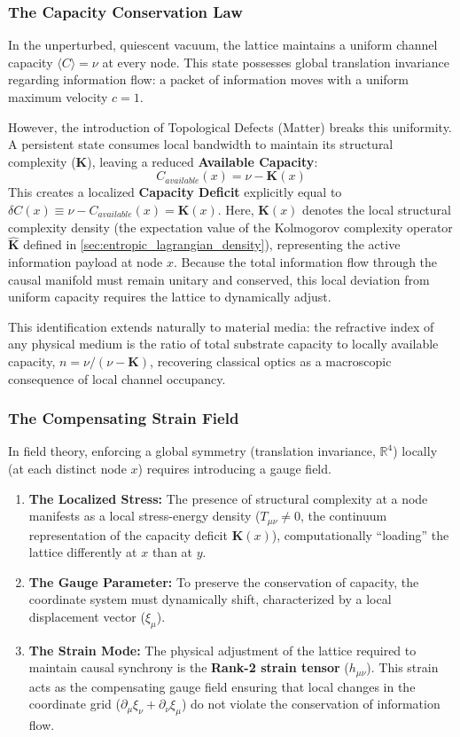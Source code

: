 \subsubsection{The Capacity Conservation Law}
In the unperturbed, quiescent vacuum, the lattice maintains a uniform channel capacity $\langle C \rangle = \nu$ at every node. This state possesses global translation invariance regarding information flow: a packet of information moves with a uniform maximum velocity $c = 1$.

However, the introduction of Topological Defects (Matter) breaks this uniformity. A persistent state consumes local bandwidth to maintain its structural complexity ($\mathbf{K}$), leaving a reduced \textbf{Available Capacity}:
\begin{equation}
C_{available}(x) = \nu - \mathbf{K}(x)
\end{equation}
This creates a localized \textbf{Capacity Deficit} explicitly equal to $\delta C(x) \equiv \nu - C_{available}(x) = \mathbf{K}(x)$. Here, $\mathbf{K}(x)$ denotes the local structural complexity density (the expectation value of the Kolmogorov complexity operator $\hat{\mathbf{K}}$ defined in \cref{sec:entropic_lagrangian_density}), representing the active information payload at node $x$. Because the total information flow through the causal manifold must remain unitary and conserved, this local deviation from uniform capacity requires the lattice to dynamically adjust.

This identification extends naturally to material media: the refractive index of any physical medium is the ratio of total substrate capacity to locally available capacity, $n = \nu/(\nu - \mathbf{K})$, recovering classical optics as a macroscopic consequence of local channel occupancy.

\subsubsection{The Compensating Strain Field}
In field theory, enforcing a global symmetry (translation invariance, $\mathbb{R}^4$) locally (at each distinct node $x$) requires introducing a gauge field. 

\begin{enumerate}
    \item \textbf{The Localized Stress:} The presence of structural complexity at a node manifests as a local stress-energy density ($T_{\mu\nu} \neq 0$, the continuum representation of the capacity deficit $\mathbf{K}(x)$), computationally ``loading'' the lattice differently at $x$ than at $y$.
    \item \textbf{The Gauge Parameter:} To preserve the conservation of capacity, the coordinate system must dynamically shift, characterized by a local displacement vector ($\xi_\mu$).
    \item \textbf{The Strain Mode:} The physical adjustment of the lattice required to maintain causal synchrony is the \textbf{Rank-2 strain tensor} ($h_{\mu\nu}$). This strain acts as the compensating gauge field ensuring that local changes in the coordinate grid ($\partial_\mu\xi_\nu + \partial_\nu\xi_\mu$) do not violate the conservation of information flow.
\end{enumerate}

